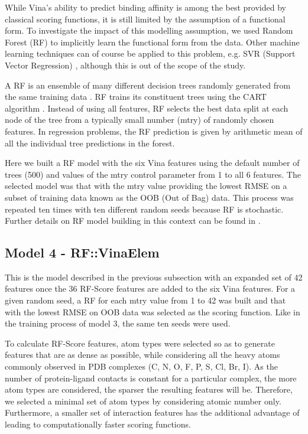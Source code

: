 While Vina's ability to predict binding affinity is among the best provided by classical scoring functions, it is still limited by the assumption of a functional form. To investigate the impact of this modelling assumption, we used Random Forest (RF) \citep{1309} to implicitly learn the functional form from the data. Other machine learning techniques can of course be applied to this problem, e.g. SVR (Support Vector Regression) \citep{1295}, although this is out of the scope of the study.

A RF is an ensemble of many different decision trees randomly generated from the same training data \citep{1309}. RF trains its constituent trees using the CART algorithm \citep{1310}. Instead of using all features, RF selects the best data split at each node of the tree from a typically small number (mtry) of randomly chosen features. In regression problems, the RF prediction is given by arithmetic mean of all the individual tree predictions in the forest.

Here we built a RF model with the six Vina features using the default number of trees (500) and values of the mtry control parameter from 1 to all 6 features. The selected model was that with the mtry value providing the lowest RMSE on a subset of training data known as the OOB (Out of Bag) data. This process was repeated ten times with ten different random seeds because RF is stochastic. Further details on RF model building in this context can be found in \citep{564}.

\subsection{Model 4 - RF::VinaElem}

This is the model described in the previous subsection with an expanded set of 42 features once the 36 RF-Score features are added to the six Vina features. For a given random seed, a RF for each mtry value from 1 to 42 was built and that with the lowest RMSE on OOB data was selected as the scoring function. Like in the training process of model 3, the same ten seeds were used.

To calculate RF-Score features, atom types were selected so as to generate features that are as dense as possible, while considering all the heavy atoms commonly observed in PDB complexes (C, N, O, F, P, S, Cl, Br, I). As the number of protein-ligand contacts is constant for a particular complex, the more atom types are considered, the sparser the resulting features will be. Therefore, we selected a minimal set of atom types by considering atomic number only. Furthermore, a smaller set of interaction features has the additional advantage of leading to computationally faster scoring functions.

